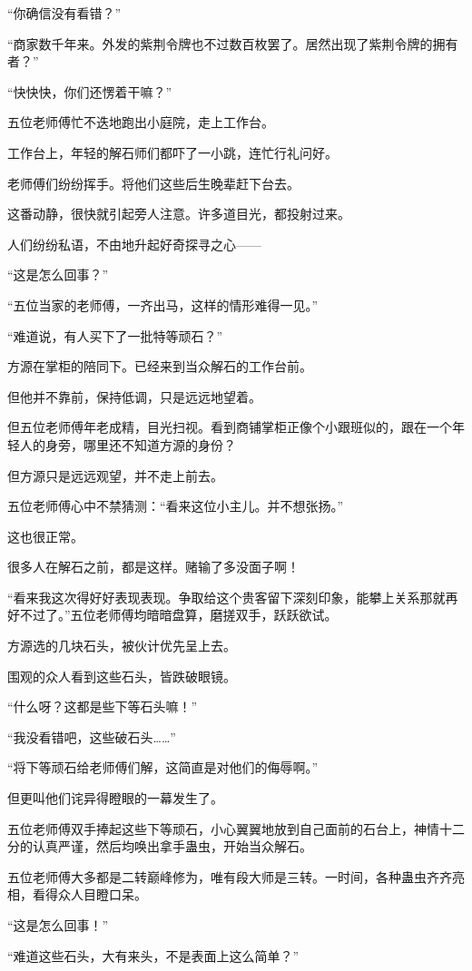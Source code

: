 \begin{this_body}
“你确信没有看错？”

“商家数千年来。外发的紫荆令牌也不过数百枚罢了。居然出现了紫荆令牌的拥有者？”

“快快快，你们还愣着干嘛？”

五位老师傅忙不迭地跑出小庭院，走上工作台。

工作台上，年轻的解石师们都吓了一小跳，连忙行礼问好。

老师傅们纷纷挥手。将他们这些后生晚辈赶下台去。

这番动静，很快就引起旁人注意。许多道目光，都投射过来。

人们纷纷私语，不由地升起好奇探寻之心——

“这是怎么回事？”

“五位当家的老师傅，一齐出马，这样的情形难得一见。”

“难道说，有人买下了一批特等顽石？”

方源在掌柜的陪同下。已经来到当众解石的工作台前。

但他并不靠前，保持低调，只是远远地望着。

但五位老师傅年老成精，目光扫视。看到商铺掌柜正像个小跟班似的，跟在一个年轻人的身旁，哪里还不知道方源的身份？

但方源只是远远观望，并不走上前去。

五位老师傅心中不禁猜测：“看来这位小主儿。并不想张扬。”

这也很正常。

很多人在解石之前，都是这样。赌输了多没面子啊！

“看来我这次得好好表现表现。争取给这个贵客留下深刻印象，能攀上关系那就再好不过了。”五位老师傅均暗暗盘算，磨搓双手，跃跃欲试。

方源选的几块石头，被伙计优先呈上去。

围观的众人看到这些石头，皆跌破眼镜。

“什么呀？这都是些下等石头嘛！”

“我没看错吧，这些破石头……”

“将下等顽石给老师傅们解，这简直是对他们的侮辱啊。”

但更叫他们诧异得瞪眼的一幕发生了。

五位老师傅双手捧起这些下等顽石，小心翼翼地放到自己面前的石台上，神情十二分的认真严谨，然后均唤出拿手蛊虫，开始当众解石。

五位老师傅大多都是二转巅峰修为，唯有段大师是三转。一时间，各种蛊虫齐齐亮相，看得众人目瞪口呆。

“这是怎么回事！”

“难道这些石头，大有来头，不是表面上这么简单？”


\end{this_body}
